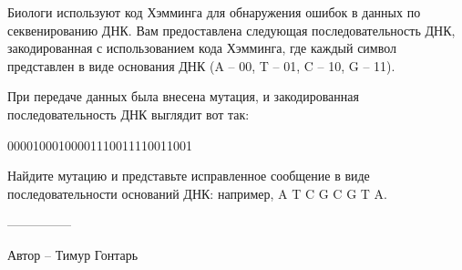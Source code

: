 \question
Биологи используют код Хэмминга для обнаружения ошибок в данных по секвенированию ДНК. Вам предоставлена следующая последовательность ДНК, закодированная с использованием кода Хэмминга, где каждый символ представлен в виде основания ДНК (A -- 00, T -- 01, C -- 10, G -- 11).

При передаче данных была внесена мутация, и закодированная последовательность ДНК выглядит вот так: 
\begin{center}
00001000100001110011110011001
\end{center}

Найдите мутацию и представьте исправленное сообщение в виде последовательности оснований ДНК: например, A T C G C G T A.

---------------

Автор -- Тимур Гонтарь